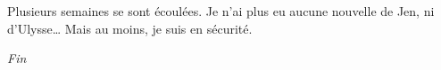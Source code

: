 Plusieurs semaines se sont écoulées. Je n'ai plus eu aucune nouvelle de Jen, ni d'Ulysse… Mais au moins, je suis en sécurité.

\begin{center}
\textit{Fin}
\end{center}





